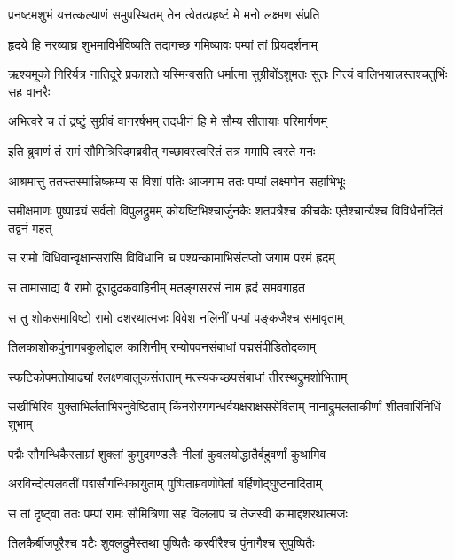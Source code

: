 \twolineshloka
{प्रनष्टमशुभं यत्तत्कल्याणं समुपस्थितम्}
{तेन त्वेतत्प्रहृष्टं मे मनो लक्ष्मण संप्रति} %

\twolineshloka
{हृदये हि नरव्याघ्र शुभमाविर्भविष्यति}
{तदागच्छ गमिष्यावः पम्पां तां प्रियदर्शनाम्} %

\threelineshloka
{ऋश्यमूको गिरिर्यत्र नातिदूरे प्रकाशते}
{यस्मिन्वसति धर्मात्मा सुग्रीवोंऽशुमतः सुतः}
{नित्यं वालिभयात्त्रस्तश्चतुर्भिः सह वानरैः} %

\twolineshloka
{अभित्वरे च तं द्रष्टुं सुग्रीवं वानरर्षभम्}
{तदधीनं हि मे सौम्य सीतायाः परिमार्गणम्} %

\twolineshloka
{इति ब्रुवाणं तं रामं सौमित्रिरिदमब्रवीत्}
{गच्छावस्त्वरितं तत्र ममापि त्वरते मनः} %

\twolineshloka
{आश्रमात्तु ततस्तस्मान्निष्क्रम्य स विशां पतिः}
{आजगाम ततः पम्पां लक्ष्मणेन सहाभिभूः} %

\threelineshloka
{समीक्षमाणः पुष्पाढ्यं सर्वतो विपुलद्रुमम्}
{कोयष्टिभिश्चार्जुनकैः शतपत्रैश्च कीचकैः}
{एतैश्चान्यैश्च विविधैर्नादितं तद्वनं महत्} %

\twolineshloka
{स रामो विधिवान्वृक्षान्सरांसि विविधानि च}
{पश्यन्कामाभिसंतप्तो जगाम परमं ह्रदम्} %

\twolineshloka
{स तामासाद्य वै रामो दूरादुदकवाहिनीम्}
{मतङ्गसरसं नाम ह्रदं समवगाहत} %

\twolineshloka
{स तु शोकसमाविष्टो रामो दशरथात्मजः}
{विवेश नलिनीं पम्पां पङ्कजैश्च समावृताम्} %

\twolineshloka
{तिलकाशोकपुंनागबकुलोद्दाल काशिनीम्}
{रम्योपवनसंबाधां पद्मसंपीडितोदकाम्} %

\twolineshloka
{स्फटिकोपमतोयाढ्यां श्लक्ष्णवालुकसंतताम्}
{मत्स्यकच्छपसंबाधां तीरस्थद्रुमशोभिताम्} %

\threelineshloka
{सखीभिरिव युक्ताभिर्लताभिरनुवेष्टिताम्}
{किंनरोरगगन्धर्वयक्षराक्षससेविताम्}
{नानाद्रुमलताकीर्णां शीतवारिनिधिं शुभाम्} %

\twolineshloka
{पद्मैः सौगन्धिकैस्ताम्रां शुक्लां कुमुदमण्डलैः}
{नीलां कुवलयोद्धातैर्बहुवर्णां कुथामिव} %

\twolineshloka
{अरविन्दोत्पलवतीं पद्मसौगन्धिकायुताम्}
{पुष्पिताम्रवणोपेतां बर्हिणोद्घुष्टनादिताम्} %

\twolineshloka
{स तां दृष्ट्वा ततः पम्पां रामः सौमित्रिणा सह}
{विललाप च तेजस्वी कामाद्दशरथात्मजः} %

\twolineshloka
{तिलकैर्बीजपूरैश्च वटैः शुक्लद्रुमैस्तथा}
{पुष्पितैः करवीरैश्च पुंनागैश्च सुपुष्पितैः} %

